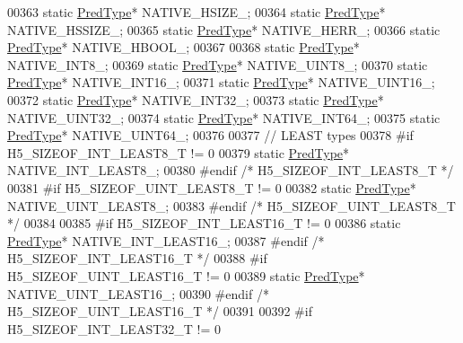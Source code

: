 \begin{DoxyCode}
00363         \textcolor{keyword}{static} \hyperlink{class_h5_1_1_pred_type}{PredType}* NATIVE\_HSIZE\_;
00364         \textcolor{keyword}{static} \hyperlink{class_h5_1_1_pred_type}{PredType}* NATIVE\_HSSIZE\_;
00365         \textcolor{keyword}{static} \hyperlink{class_h5_1_1_pred_type}{PredType}* NATIVE\_HERR\_;
00366         \textcolor{keyword}{static} \hyperlink{class_h5_1_1_pred_type}{PredType}* NATIVE\_HBOOL\_;
00367 
00368         \textcolor{keyword}{static} \hyperlink{class_h5_1_1_pred_type}{PredType}* NATIVE\_INT8\_;
00369         \textcolor{keyword}{static} \hyperlink{class_h5_1_1_pred_type}{PredType}* NATIVE\_UINT8\_;
00370         \textcolor{keyword}{static} \hyperlink{class_h5_1_1_pred_type}{PredType}* NATIVE\_INT16\_;
00371         \textcolor{keyword}{static} \hyperlink{class_h5_1_1_pred_type}{PredType}* NATIVE\_UINT16\_;
00372         \textcolor{keyword}{static} \hyperlink{class_h5_1_1_pred_type}{PredType}* NATIVE\_INT32\_;
00373         \textcolor{keyword}{static} \hyperlink{class_h5_1_1_pred_type}{PredType}* NATIVE\_UINT32\_;
00374         \textcolor{keyword}{static} \hyperlink{class_h5_1_1_pred_type}{PredType}* NATIVE\_INT64\_;
00375         \textcolor{keyword}{static} \hyperlink{class_h5_1_1_pred_type}{PredType}* NATIVE\_UINT64\_;
00376 
00377 \textcolor{comment}{// LEAST types}
00378 \textcolor{preprocessor}{#if H5\_SIZEOF\_INT\_LEAST8\_T != 0}
00379         \textcolor{keyword}{static} \hyperlink{class_h5_1_1_pred_type}{PredType}* NATIVE\_INT\_LEAST8\_;
00380 \textcolor{preprocessor}{#endif }\textcolor{comment}{/* H5\_SIZEOF\_INT\_LEAST8\_T */}\textcolor{preprocessor}{}
00381 \textcolor{preprocessor}{#if H5\_SIZEOF\_UINT\_LEAST8\_T != 0}
00382         \textcolor{keyword}{static} \hyperlink{class_h5_1_1_pred_type}{PredType}* NATIVE\_UINT\_LEAST8\_;
00383 \textcolor{preprocessor}{#endif }\textcolor{comment}{/* H5\_SIZEOF\_UINT\_LEAST8\_T */}\textcolor{preprocessor}{}
00384 
00385 \textcolor{preprocessor}{#if H5\_SIZEOF\_INT\_LEAST16\_T != 0}
00386         \textcolor{keyword}{static} \hyperlink{class_h5_1_1_pred_type}{PredType}* NATIVE\_INT\_LEAST16\_;
00387 \textcolor{preprocessor}{#endif }\textcolor{comment}{/* H5\_SIZEOF\_INT\_LEAST16\_T */}\textcolor{preprocessor}{}
00388 \textcolor{preprocessor}{#if H5\_SIZEOF\_UINT\_LEAST16\_T != 0}
00389         \textcolor{keyword}{static} \hyperlink{class_h5_1_1_pred_type}{PredType}* NATIVE\_UINT\_LEAST16\_;
00390 \textcolor{preprocessor}{#endif }\textcolor{comment}{/* H5\_SIZEOF\_UINT\_LEAST16\_T */}\textcolor{preprocessor}{}
00391 
00392 \textcolor{preprocessor}{#if H5\_SIZEOF\_INT\_LEAST32\_T != 0}

\end{DoxyCode}
